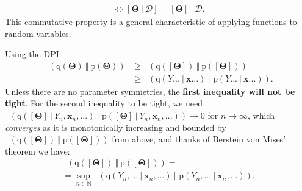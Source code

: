 \documentclass[25pt,a0paper,landscape]{tikzposter}
\newcommand{\MidSymbol}[1][]{\:#1\:}
\newcommand{\given}{\MidSymbol[\vert]}
\DeclareMathOperator{\opKale}{D_\mathrm{KL}}
\newcommand{\Kale}[2]{\opKale(#1 \MidSymbol[\Vert] #2)}
\newcommand{\opp}{\mathrm{p}}
\newcommand{\pof}[1]{\opp(#1)}
\newcommand{\opq}{\mathrm{q}}
\newcommand{\qof}[1]{\opq(#1)}
\newcommand{\W}{\boldsymbol{\Theta}}
\newcommand{\Dany}{\mathcal{D}}
\newcommand{\Y}{Y}
\newcommand{\x}{\boldsymbol{x}}
\begin{document}
\begin{columns}
{\begin{multicols}{2}
\begin{theorybox}[title=Consistency of Equivalence Classes with Bayesian Inference]
\begin{align*}
        \Leftrightarrow [\W \given \Dany] = [\W] \given \Dany.
      \end{align*}
      This commutative property is a general characteristic of applying functions to random variables. 
    \end{theorybox}
      \begin{tikzfigure}
      \end{tikzfigure}
    \begin{proofbox}[title=Equality in the Infinite Data Limit]
      Using the DPI:
      \begin{align*}
      \Kale{\qof{\W}}{\pof{\W}} &\ge \Kale{\qof{[\W]}}{\pof{[\W]}} \\
      &\ge \Kale{\qof{\Y...\given\x...}}{\pof{\Y...\given\x...}}.
      \end{align*}
      Unless there are no parameter symmetries, the \textbf{first inequality will not be tight}.
      For the second inequality to be tight, we need $\Kale{\qof{[\W] \given \Y_n,\x_n,...}}{\pof{[\W] \given \Y_n,\x_n,...}} \to 0$ for $n \to \infty$, which \emph{converges} as it is monotonically increasing and bounded by $\Kale{\qof{[\W]}}{\pof{[\W]}}$ from above, and thanks of Berstein von Mises' theorem we have:
      \begin{multline*}
      \Kale{\qof{[\W]}}{\pof{[\W]}} = \\
      = \sup_{n\in \mathbb{N}} \Kale{\qof{\Y_n,...\given\x_n,...}}{\pof{\Y_n,...\given\x_n,...}}.

\end{multline*}
\end{proofbox}
\end{multicols}}
\end{columns}
\end{document}
